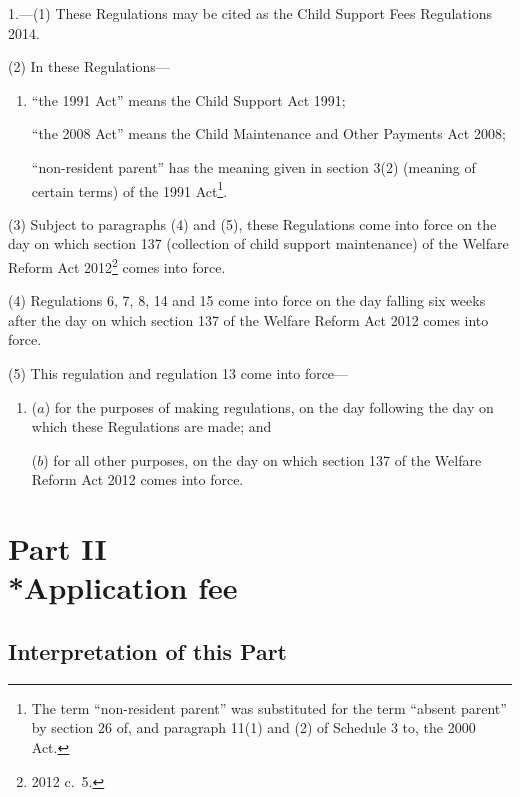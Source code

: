 \documentclass[12pt,a4paper]{article}
\begin{document}
1.—(1) These Regulations may be cited as the Child Support Fees Regulations 2014.

(2) In these Regulations—
\begin{enumerate}\item[]
“the 1991 Act” means the Child Support Act 1991;

“the 2008 Act” means the Child Maintenance and Other Payments Act 2008;

“non-resident parent” has the meaning given in section 3(2) (meaning of certain terms) of the 1991 Act\footnote{The term “non-resident parent” was substituted for the term “absent parent” by section 26 of, and paragraph 11(1) and (2) of Schedule 3 to, the 2000 Act.}.
\end{enumerate}

(3) Subject to paragraphs (4) and (5), these Regulations come into force on the day on which section 137 (collection of child support maintenance) of the Welfare Reform Act 2012\footnote{2012 c.~5.} comes into force.

(4) Regulations 6, 7, 8, 14 and 15 come into force on the day falling six weeks after the day on which section 137 of the Welfare Reform Act 2012 comes into force.

(5) This regulation and regulation 13 come into force—
\begin{enumerate}\item[]
($a$) for the purposes of making regulations, on the day following the day on which these Regulations are made; and

($b$) for all other purposes, on the day on which section 137 of the Welfare Reform Act 2012 comes into force.
\end{enumerate}

\section[Part II --- Application fee]{Part II\\*Application fee}

\renewcommand\parthead{--- Part II}

\subsection[2. Interpretation of this Part]{Interpretation of this Part}
\end{document}
